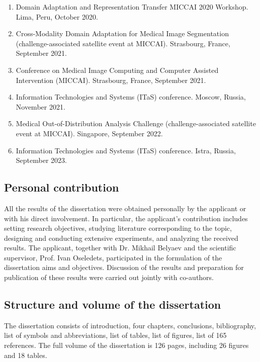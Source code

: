 \begin{enumerate}
    \item Domain Adaptation and Representation Transfer MICCAI 2020 Workshop. Lima, Peru, October 2020.
    \item Cross-Modality Domain Adaptation for Medical Image Segmentation (challenge-associated satellite event at MICCAI). Strasbourg, France, September 2021.
    \item Conference on Medical Image Computing and Computer Assisted Intervention (MICCAI). Strasbourg, France, September 2021.
    \item Information Technologies and Systems (ITaS) conference. Moscow, Russia, November 2021.
    \item Medical Out-of-Distribution Analysis Challenge (challenge-associated satellite event at MICCAI). Singapore, September 2022.
    \item Information Technologies and Systems (ITaS) conference. Istra, Russia, September 2023.
\end{enumerate}


\subsection*{Personal contribution}

All the results of the dissertation were obtained personally by the applicant or with his direct involvement. In particular, the applicant’s contribution includes setting research objectives, studying literature corresponding to the topic, designing and conducting extensive experiments, and analyzing the received results. The applicant, together with Dr. Mikhail Belyaev and the scientific supervisor, Prof. Ivan Oseledets, participated in the formulation of the dissertation aims and objectives. Discussion of the results and preparation for publication of these results were carried out jointly with co-authors.


\subsection*{Structure and volume of the dissertation} The dissertation consists of introduction, four chapters, conclusions, bibliography, list of symbols and abbreviations, list of tables, list of figures, list of 165 references. The full 
volume of the dissertation is 126 pages, including 26 figures and 18 tables.